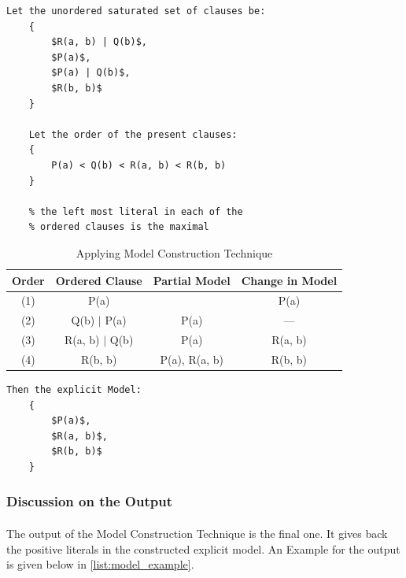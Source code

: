 			\begin{minipage}{\textwidth}
			\begin{lstlisting}[caption=Example for applying Bachmair and Ganzinger Model Construction Technique (SETUP),frame=single,mathescape]
	Let the unordered saturated set of clauses be:
	{
		$R(a, b) | Q(b)$,
		$P(a)$,
		$P(a) | Q(b)$,
		$R(b, b)$
	}
	
	Let the order of the present clauses:
	{
		P(a) < Q(b) < R(a, b) < R(b, b)
	}			

	% the left most literal in each of the
	% ordered clauses is the maximal
		\end{lstlisting}	
	
\begin{table}[H]
		\centering
		\begin{tabular}{||c | c | c | c||}
		\toprule		
		Order & Ordered Clause & Partial Model & Change in Model \\ [0.5ex] 
		\midrule
 		(1) & P(a) 			& {} 				& P(a) \\ 
 		(2) & Q(b) $\vert$ P(a)  	& {P(a)} 			& --- \\
 		(3) & R(a, b) $\vert$ Q(b)	& {P(a)}		 		& R(a, b) \\
 		(4) & R(b, b) 		& {P(a), R(a, b)} 	& R(b, b) \\ [1ex]
		\bottomrule		
		\end{tabular}
		\caption{Applying Model Construction Technique}
		\label{table:app_model}
\end{table}

		
			\begin{lstlisting}[caption=Example for applying Bachmair and Ganzinger Model Construction Technique (OUTPUT),frame=single,mathescape]
	Then the explicit Model:
	{
		$P(a)$,
		$R(a, b)$,
		$R(b, b)$	
	}		
			\end{lstlisting}
			\end{minipage}
		
		
	

	\subsubsection{Discussion on the Output}
		\paragraph{}		
		The output of the Model Construction Technique is the final one. It gives back the positive literals in the constructed explicit model. An Example for the output is given below in \ref{list:model_example}.
		
